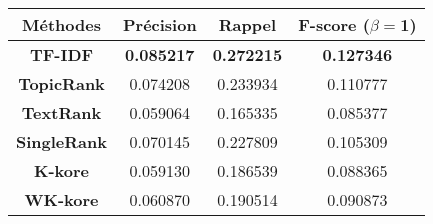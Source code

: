\begin{tabular}{|c|c|c|c|}
\hline 
\textbf{Méthodes} & \textbf{Précision} & \textbf{Rappel} & \textbf{F-score ($\beta=$1)} \\ 
\hline 
\textbf{TF-IDF} & \textbf{0.085217} & \textbf{0.272215} & \textbf{0.127346} \\ 
\hline 
\textbf{TopicRank} & 0.074208 & 0.233934 & 0.110777 \\ 
\hline 
\textbf{TextRank} & 0.059064 & 0.165335 & 0.085377 \\ 
\hline 
\textbf{SingleRank} & 0.070145 & 0.227809 & 0.105309 \\ 
\hline 
\textbf{K-kore} & 0.059130 & 0.186539 & 0.088365 \\ 
\hline 
\textbf{WK-kore} & 0.060870 & 0.190514 & 0.090873 \\ 
\hline 
\end{tabular}